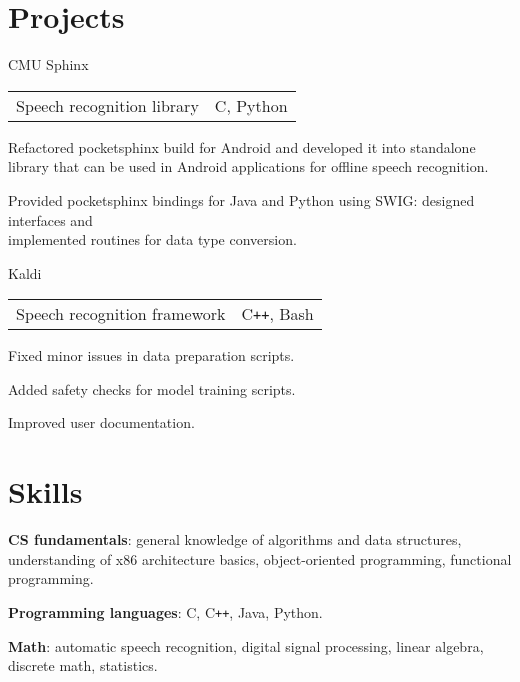 \documentclass[11pt,a4paper]{article}
\begin{document}
\section{Projects}
\begin{multicols}{2}
  \raggedcolumns

  \begin{project2}{CMU Sphinx}{\begin{tabular}{@{}l|l}Speech recognition library & C, Python\\\end{tabular}}
    \begin{items}
    \item Refactored pocketsphinx build for Android and developed it into
      standalone library that can be used in Android applications for offline
      speech recognition.
    \item Provided pocketsphinx bindings for Java and Python using SWIG:
      designed interfaces and\\implemented routines for data type conversion.
    \end{items}
  \end{project2}

  \columnbreak

  \begin{project2}{Kaldi}{\begin{tabular}{@{}l|l}Speech recognition framework & C\texttt{++}, Bash\\\end{tabular}}
    \begin{items}
    \item Fixed minor issues in data preparation scripts.
    \item Added safety checks for model training scripts.
    \item Improved user documentation.
    \end{items}
  \end{project2}

\end{multicols}

\section{Skills}
\begin{multicols}{2}
  \raggedcolumns
  \begin{items}
  \item \textbf{CS fundamentals}: general knowledge of algorithms and
    data structures, understanding of x86 architecture basics,
    object-oriented programming, functional programming.

    \columnbreak

  \item \textbf{Programming languages}: C, C\texttt{++},
    Java, Python.
  \item \textbf{Math}: automatic speech recognition, digital signal processing,
    linear algebra, discrete math, statistics.
  \end{items}
\end{multicols}
\end{document}
